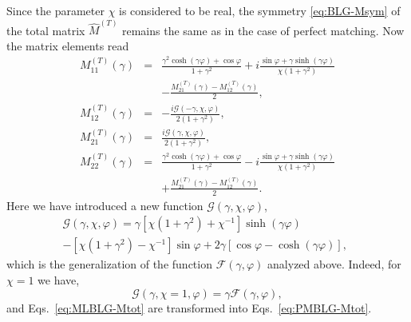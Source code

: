 \documentclass[aps,pra,reprint,showpacs,bibnotes,preprintnumbers,twoside,eqsecnum]{revtex4-1}
\begin{document}
Since the parameter $\chi$ is considered to be real, the symmetry \eqref{eq:BLG-Msym} of the total matrix $\hat{M}^{(T)}$ remains the same as in the case of perfect matching. Now the matrix elements read
%
\begin{eqnarray}\label{eq:MLBLG-Mtot}
M^{(T)}_{11}(\gamma)&=&\frac{\gamma^2\cosh(\gamma\varphi)+\cos\varphi}{1+\gamma^2}+
i\frac{\sin\varphi+\gamma\sinh(\gamma\varphi)}{\chi(1+\gamma^2)}\nonumber\\
&&-\frac{M^{(T)}_{21}(\gamma)-M^{(T)}_{12}(\gamma)}{2},\nonumber\\
M^{(T)}_{12}(\gamma)&=&-\frac{i\mathcal{G}(-\gamma,\chi,\varphi)}{2(1+\gamma^2)},\\
M^{(T)}_{21}(\gamma)&=&\frac{i\mathcal{G}(\gamma,\chi,\varphi)}{2(1+\gamma^2)},\nonumber\\
M^{(T)}_{22}(\gamma)&=&\frac{\gamma^2\cosh(\gamma\varphi)+\cos\varphi}{1+\gamma^2}-i\frac{\sin\varphi+\gamma\sinh(\gamma\varphi)}{\chi(1+\gamma^2)}\nonumber\\[6pt]
&&+\frac{M^{(T)}_{21}(\gamma)-M^{(T)}_{12}(\gamma)}{2}.\nonumber
\end{eqnarray}
Here we have introduced a new function $\mathcal{G}(\gamma,\chi,\varphi)$,
%
\begin{eqnarray}\label{eq:G-def}
&&\mathcal{G}(\gamma,\chi,\varphi)=\gamma\left[\chi(1+\gamma^2)+\chi^{-1}\right]\sinh(\gamma\varphi)\\
&&-\left[\chi(1+\gamma^2)-\chi^{-1}\right]\sin\varphi+2\gamma\left[\cos\varphi-\cosh(\gamma\varphi)\right],\qquad\nonumber
\end{eqnarray}
which is the generalization of the function $\mathcal{F}(\gamma,\varphi)$ analyzed above. Indeed, for $\chi=1$ we have,
%
\begin{equation}\label{eq:G-F}
\mathcal{G}(\gamma,\chi=1,\varphi)=\gamma\mathcal{F}(\gamma,\varphi),
\end{equation}
and Eqs.~\eqref{eq:MLBLG-Mtot} are transformed into Eqs.~\eqref{eq:PMBLG-Mtot}.
\end{document}
